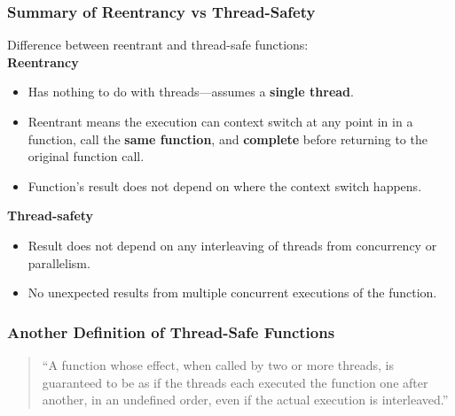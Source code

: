 \begin{frame}
  \frametitle{Summary of Reentrancy vs Thread-Safety}

  
  Difference between reentrant and thread-safe functions:\\[1em]

  {\bf Reentrancy}
  \begin{itemize}
    \item Has nothing to do with threads---assumes a {\bf single thread}.
    \item Reentrant means the execution can context switch at any point in
      in a function, call the {\bf same function}, and {\bf complete} before
      returning to the original function call.
    \item Function's result does not depend on where the context switch happens.
  \end{itemize}
  \vfill
  {\bf Thread-safety}
  \begin{itemize}
    \item Result does not depend on any interleaving of threads from
      concurrency or parallelism.
    \item No unexpected results from multiple concurrent executions of the function.
  \end{itemize}
  
\end{frame}

\begin{frame}
  \frametitle{Another Definition of Thread-Safe Functions}

  

\begin{quote}
  ``A function whose effect, when called by two or more threads, is guaranteed to
  be as if the threads each executed the function one after another, in an
  undefined order, even if the actual execution is interleaved.''
\end{quote}
  
\end{frame}

